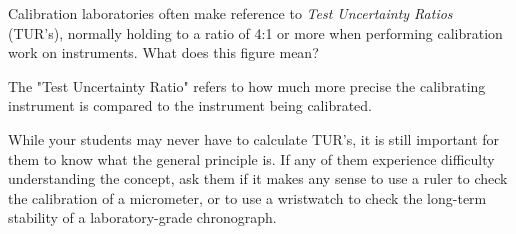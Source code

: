 

Calibration laboratories often make reference to {\it Test Uncertainty Ratios} (TUR's), normally holding to a ratio of 4:1 or more when performing calibration work on instruments.  What does this figure mean?







The "Test Uncertainty Ratio" refers to how much more precise the calibrating instrument is compared to the instrument being calibrated.







While your students may never have to calculate TUR's, it is still important for them to know what the general principle is.  If any of them experience difficulty understanding the concept, ask them if it makes any sense to use a ruler to check the calibration of a micrometer, or to use a wristwatch to check the long-term stability of a laboratory-grade chronograph.




